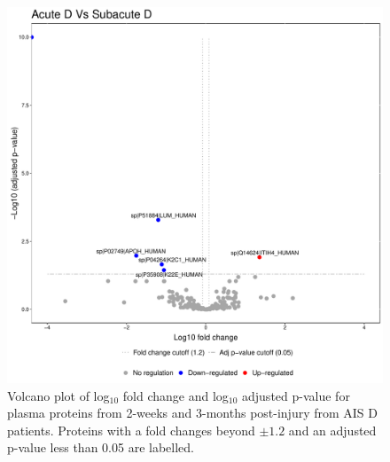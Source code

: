 \documentclass[9pt,lineno]{elife}
\begin{document}
\begin{landscape}
\begin{landscape}
\begin{landscape}
\begin{landscape}
\begin{figure}
\includegraphics[width=1\linewidth]{figures/openms_protein_quantification/label_free/volcano_plots/openms_volcano_plot_2021-08-10_0022} \caption{Volcano plot of log\(_10\) fold change and log\(_10\) adjusted p-value for plasma proteins from 2-weeks and 3-months post-injury from AIS D patients. Proteins with a fold changes beyond \(\pm 1.2\) and an adjusted p-value less than 0.05 are labelled.}\label{fig:volc-plot-acute-d-vs-subacute-d}
\end{figure}




\end{landscape}
\end{landscape}
\end{landscape}
\end{landscape}
\end{document}
